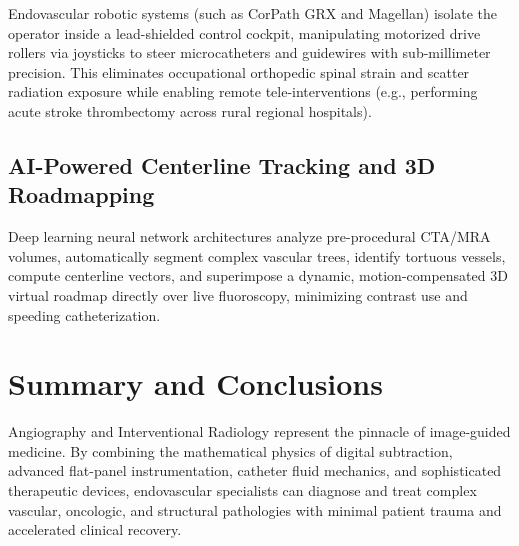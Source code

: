 \documentclass[11pt,a4paper]{article}
\begin{document}
Endovascular robotic systems (such as CorPath GRX and Magellan) isolate the operator inside a lead-shielded control cockpit, manipulating motorized drive rollers via joysticks to steer microcatheters and guidewires with sub-millimeter precision. This eliminates occupational orthopedic spinal strain and scatter radiation exposure while enabling remote tele-interventions (e.g., performing acute stroke thrombectomy across rural regional hospitals).

\subsection{AI-Powered Centerline Tracking and 3D Roadmapping}

Deep learning neural network architectures analyze pre-procedural CTA/MRA volumes, automatically segment complex vascular trees, identify tortuous vessels, compute centerline vectors, and superimpose a dynamic, motion-compensated 3D virtual roadmap directly over live fluoroscopy, minimizing contrast use and speeding catheterization.

\section{Summary and Conclusions}

Angiography and Interventional Radiology represent the pinnacle of image-guided medicine. By combining the mathematical physics of digital subtraction, advanced flat-panel instrumentation, catheter fluid mechanics, and sophisticated therapeutic devices, endovascular specialists can diagnose and treat complex vascular, oncologic, and structural pathologies with minimal patient trauma and accelerated clinical recovery.
\end{document}
